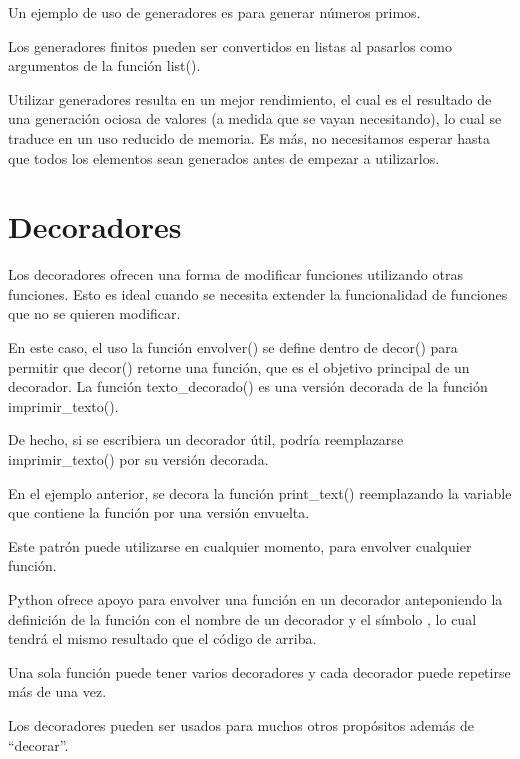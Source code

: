 \documentclass{report}
\newcommand{\doble}[1]{``#1''}
\begin{document}
Un ejemplo de uso de generadores es para generar números primos.


Los generadores finitos pueden ser convertidos en listas al pasarlos como argumentos de la función list().


Utilizar generadores resulta en un mejor rendimiento, el cual es el resultado de una generación ociosa de valores (a medida que se vayan necesitando), lo cual se traduce en un uso reducido de memoria. Es más, no necesitamos esperar hasta que todos los elementos sean generados antes de empezar a utilizarlos.

\section{Decoradores}

Los decoradores ofrecen una forma de modificar funciones utilizando otras funciones. Esto es ideal cuando se necesita extender la funcionalidad de funciones que no se quieren modificar.


En este caso, el uso la función envolver() se define dentro de decor() para permitir que decor() retorne una función, que es el objetivo principal de un decorador. La función texto\_decorado() es una versión decorada de la función imprimir\_texto().

De hecho, si se escribiera un decorador útil, podría reemplazarse imprimir\_texto() por su versión decorada.


En el ejemplo anterior, se decora la función print\_text() reemplazando la variable que contiene la función por una versión envuelta.


Este patrón puede utilizarse en cualquier momento, para envolver cualquier función.

Python ofrece apoyo para envolver una función en un decorador anteponiendo la definición de la función con el nombre de un decorador y el símbolo \@, lo cual tendrá el mismo resultado que el código de arriba.


Una sola función puede tener varios decoradores y cada decorador puede repetirse más de una vez.


Los decoradores pueden ser usados para muchos otros propósitos además de \doble{decorar}.
\end{document}
